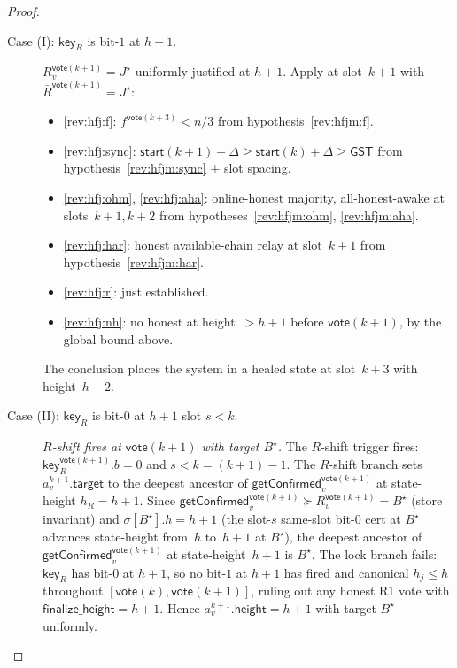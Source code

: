 \ifx\litemode\undefined\documentclass{article}\fi
\newcommand{\target}{\mathsf{target}}
\newcommand{\height}{\mathsf{height}}
\newcommand{\finalizeHeight}{\mathsf{finalize\_height}}
\newcommand{\key}{\mathsf{key}}
\newcommand{\start}{\mathsf{start}}
\newcommand{\vote}{\mathsf{vote}}
\newcommand{\comm}[1]{\bar{#1}}
\newcommand{\getConfirmed}{\textsf{getConfirmed}\xspace}
\theoremstyle{plain}
\theoremstyle{definition}
\theoremstyle{remark}
\newcommand{\GST}{\ensuremath{\mathsf{GST}}}
\newcommand{\OHM}{online-honest majority\xspace}
\newcommand{\HAR}{honest available-chain relay\xspace}
\newcommand{\AHA}{all-honest-awake\xspace}
\begin{document}
\begin{proof}
\begin{description}
\item[{Case (I): $\key_R$ is bit-$1$ at $h+1$.}]\hfill

$R_v^{\vote(k+1)} = J^\star$ uniformly justified at $h+1$. Apply  at slot~$k+1$ with $\comm{R}^{\vote(k+1)} = J^\star$:
\begin{itemize}
  \item \ref{rev:hfj:f}: $f^{\vote(k+3)} < n/3$ from hypothesis~\ref{rev:hfjm:f}.
  \item \ref{rev:hfj:sync}: $\start(k+1) - \Delta \geq \start(k) + \Delta \geq \GST$ from hypothesis~\ref{rev:hfjm:sync} + slot spacing.
  \item \ref{rev:hfj:ohm}, \ref{rev:hfj:aha}: \OHM, \AHA at slots~$k+1, k+2$ from hypotheses~\ref{rev:hfjm:ohm}, \ref{rev:hfjm:aha}.
  \item \ref{rev:hfj:har}: \HAR at slot~$k+1$ from hypothesis~\ref{rev:hfjm:har}.
  \item \ref{rev:hfj:r}: just established.
  \item \ref{rev:hfj:nh}: no honest at height~$> h+1$ before $\vote(k+1)$, by the global bound above.
\end{itemize}
The conclusion places the system in a healed state at slot~$k+3$ with height~$h+2$.

\item[{Case (II): $\key_R$ is bit-$0$ at $h+1$ slot $s < k$.}]\hfill

\emph{$R$-shift fires at $\vote(k+1)$ with target $B^\star$.}
The $R$-shift trigger fires: $\key_R^{\vote(k+1)}.b = 0$ and $s < k = (k+1) - 1$. The $R$-shift branch sets $a^{k+1}_v.\target$ to the deepest ancestor of $\getConfirmed_v^{\vote(k+1)}$ at state-height $h_R = h+1$. Since $\getConfirmed_v^{\vote(k+1)} \succeq R_v^{\vote(k+1)} = B^\star$ (store invariant) and $\sigma[B^\star].h = h+1$ (the slot-$s$ same-slot bit-$0$ cert at $B^\star$ advances state-height from~$h$ to~$h+1$ at $B^\star$), the deepest ancestor of $\getConfirmed_v^{\vote(k+1)}$ at state-height~$h+1$ is $B^\star$. The lock branch fails: $\key_R$ has bit-$0$ at $h+1$, so no bit-$1$ at $h+1$ has fired and canonical $h_j \leq h$ throughout $[\vote(k), \vote(k+1)]$, ruling out any honest R1 vote with $\finalizeHeight = h+1$. Hence $a^{k+1}_v.\height = h+1$ with target $B^\star$ uniformly.


\end{description}
\end{proof}
\end{document}
